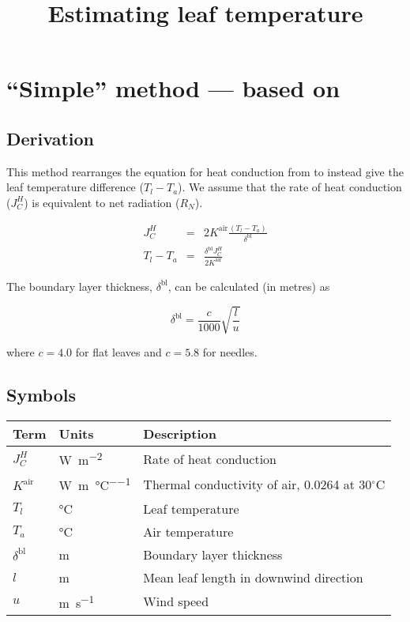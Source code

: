 \documentclass[a4paper]{article}
\title{Estimating leaf temperature}
\date{}
\begin{document}
\maketitle



\section{``Simple'' method --- based on \citet{nobel83}}

\subsection{Derivation}

This method rearranges the equation for heat conduction from \citet[p.~361]{nobel83} to instead give 
the leaf temperature difference ($T_l - T_a$).  We assume that the rate of heat conduction ($J_C^H$) 
    is equivalent to net radiation ($R_N$).

\begin{eqnarray}
J_C^H & = & 2 K^\text{air} \frac{(T_l - T_a)}{\delta^\text{bl}} \\
T_l - T_a & = & \frac{\delta^\text{bl}J_C^H}{2 K^\text{air}}
\end{eqnarray}

The boundary layer thickness, $\delta^\text{bl}$, can be calculated (in metres) as

\begin{equation}
\delta^\text{bl} = \frac{c}{1000} \sqrt{\frac{l}{u}}
\end{equation}

where $c=4.0$ for flat leaves and $c=5.8$ for needles.

\subsection{Symbols}
\begin{tabularx}{\textwidth}{l | l | X}
Term & Units & Description \\
\hline
$J_C^H$ & \si{\watt\per\metre\squared} & Rate of heat conduction \\
$K^\text{air}$ & \si{\watt\per\metre\per\degreeCelsius} & Thermal conductivity of air, 0.0264 at 
30$^\circ$C \\
$T_l$ & \si{\degreeCelsius} & Leaf temperature \\
$T_a$ & \si{\degreeCelsius} & Air temperature \\
$\delta^\text{bl}$ & \si{\metre} & Boundary layer thickness \\
$l$ & \si{\metre} & Mean leaf length in downwind direction \\
$u$ & \si{\metre\per\second} & Wind speed \\
\end{tabularx}
\end{document}
